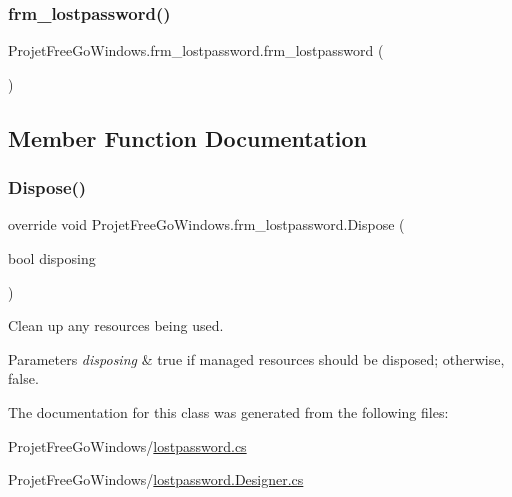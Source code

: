 \subsubsection{\texorpdfstring{frm\+\_\+lostpassword()}{frm\_lostpassword()}}
{\footnotesize\ttfamily Projet\+Free\+Go\+Windows.\+frm\+\_\+lostpassword.\+frm\+\_\+lostpassword (\begin{DoxyParamCaption}{ }\end{DoxyParamCaption})}



\subsection{Member Function Documentation}
\mbox{\label{class_projet_free_go_windows_1_1frm__lostpassword_a7ec795479fd88d4c97680550b93703ff}} 
\subsubsection{\texorpdfstring{Dispose()}{Dispose()}}
{\footnotesize\ttfamily override void Projet\+Free\+Go\+Windows.\+frm\+\_\+lostpassword.\+Dispose (\begin{DoxyParamCaption}\item[{bool}]{disposing }\end{DoxyParamCaption})\hspace{0.3cm}{\ttfamily [protected]}}



Clean up any resources being used. 


\begin{DoxyParams}{Parameters}
{\em disposing} & true if managed resources should be disposed; otherwise, false.\\
\hline
\end{DoxyParams}


The documentation for this class was generated from the following files\+:\begin{DoxyCompactItemize}
\item 
Projet\+Free\+Go\+Windows/\hyperlink{lostpassword_8cs}{lostpassword.\+cs}\item 
Projet\+Free\+Go\+Windows/\hyperlink{lostpassword_8_designer_8cs}{lostpassword.\+Designer.\+cs}\end{DoxyCompactItemize}
